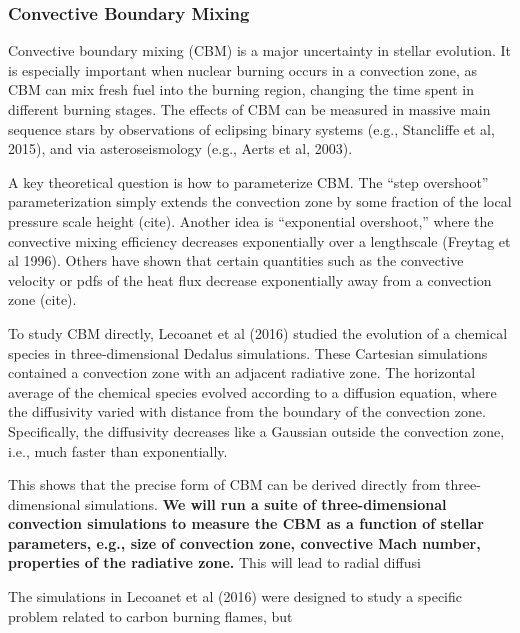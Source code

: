 {\color{purple}
\subsubsection{Convective Boundary Mixing}
}

Convective boundary mixing (CBM) is a major uncertainty in stellar evolution. It is especially important when nuclear burning occurs in a convection zone, as CBM can mix fresh fuel into the burning region, changing the time spent in different burning stages. The effects of CBM can be measured in massive main sequence stars by observations of eclipsing binary systems (e.g., Stancliffe et al, 2015), and via asteroseismology (e.g., Aerts et al, 2003).

A key theoretical question is how to parameterize CBM. The ``step overshoot'' parameterization simply extends the convection zone by some fraction of the local pressure scale height (cite). Another idea is ``exponential overshoot,'' where the convective mixing efficiency decreases exponentially over a lengthscale (Freytag et al 1996). Others have shown that certain quantities such as the convective velocity or pdfs of the heat flux decrease exponentially away from a convection zone (cite).

To study CBM directly, Lecoanet et al (2016) studied the evolution of a chemical species in three-dimensional Dedalus simulations.  These Cartesian simulations contained a convection zone with an adjacent radiative zone. The horizontal average of the chemical species evolved according to a diffusion equation, where the diffusivity varied with distance from the boundary of the convection zone. Specifically, the diffusivity decreases like a Gaussian outside the convection zone, i.e., much faster than exponentially.

This shows that the precise form of CBM can be derived directly from three-dimensional simulations. \textbf{We will run a suite of three-dimensional convection simulations to measure the CBM as a function of stellar parameters, e.g., size of convection zone, convective Mach number, properties of the radiative zone.} This will lead to radial diffusi

The simulations in Lecoanet et al (2016) were designed to study a specific problem related to carbon burning flames, but 
